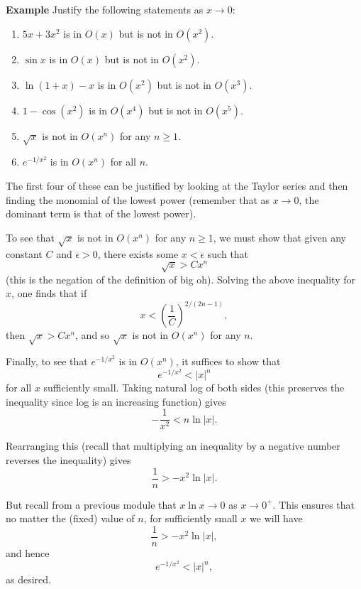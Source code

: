 \documentclass[a4paper]{book}
\begin{document}
\begin{sloppypar}
\textbf{Example} Justify the following statements as $x \rightarrow 0$:
\begin{enumerate}
	\item $5x+3x^2$ is in $O(x)$ but is not in $O(x^2)$.
	\item $\sin x$ is in $O(x)$ but is not in $O(x^2)$.
	\item $\ln(1+x)-x$ is in $O(x^2)$ but is not in $O(x^3)$.
	\item $1 - \cos(x^2)$ is in $O(x^4)$ but is not in $O(x^5)$.
	\item $\sqrt{x}$ is not in $O(x^n)$ for any $n \geq 1$.
	\item $e^{-1/x^2}$ is in $O(x^n)$ for all $n$.
\end{enumerate}
\begin{examplebox}
The first four of these can be justified by looking at the Taylor series and then finding the monomial of the lowest power (remember that as $x \rightarrow 0$, the dominant term is that of the lowest power).

To see that $\sqrt{x}$ is not in $O(x^n)$ for any $n \geq 1$, we must show that given any constant $C$ and $\epsilon>0$, there exists some $x < \epsilon$ such that \[ \sqrt{x} > C x^n \] (this is the negation of the definition of big oh). Solving the above inequality for $x$, one finds that if \[ x < \left(\frac{1}{C}\right)^{2/(2n-1)}, \] then $\sqrt{x} > C x^n$, and so $\sqrt{x}$ is not in $O(x^n)$ for any $n$.

Finally, to see that $e^{-1/x^2}$ is in $O(x^n)$, it suffices to show that \[ e^{-1/x^2} < |x|^n \] for all $x$ sufficiently small. Taking natural log of both sides (this preserves the inequality since log is an increasing function) gives \[ -\frac{1}{x^2} < n \ln|x|. \]

Rearranging this (recall that multiplying an inequality by a negative number reverses the inequality) gives \[ \frac{1}{n} > -x^2 \ln |x|. \]

But recall from a previous module that $ x \ln x \rightarrow 0$ as $x \rightarrow 0^+$. This ensures that no matter the (fixed) value of $n$, for sufficiently small $x$ we will have \[ \frac{1}{n} > -x^2 \ln |x|, \] and hence \[ e^{-1/x^2} < |x|^n, \] as desired.
\end{examplebox}


\end{sloppypar}
\end{document}
